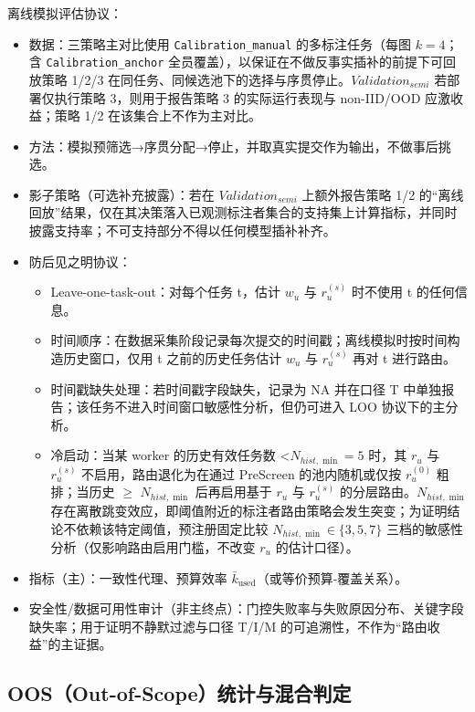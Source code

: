 离线模拟评估协议：
\begin{itemize}
    \item 数据：三策略主对比使用 \texttt{Calibration\_manual} 的多标注任务（每图 $k=4$；含 \texttt{Calibration\_anchor} 全员覆盖），以保证在不做反事实插补的前提下可回放策略 1/2/3 在同任务、同候选池下的选择与序贯停止。$Validation_{semi}$ 若部署仅执行策略 3，则用于报告策略 3 的实际运行表现与 non-IID/OOD 应激收益；策略 1/2 在该集合上不作为主对比。
    \item 方法：模拟预筛选→序贯分配→停止，并取真实提交作为输出，不做事后挑选。
    \item 影子策略（可选补充披露）：若在 $Validation_{semi}$ 上额外报告策略 1/2 的“离线回放”结果，仅在其决策落入已观测标注者集合的支持集上计算指标，并同时披露支持率；不可支持部分不得以任何模型插补补齐。
    \item 防后见之明协议：
    \begin{itemize}
        \item Leave-one-task-out：对每个任务 t，估计 $w_u$ 与 $r_u^{\left(s\right)}$ 时不使用 t 的任何信息。
        \item 时间顺序：在数据采集阶段记录每次提交的时间戳；离线模拟时按时间构造历史窗口，仅用 t 之前的历史任务估计 $w_u$ 与 $r_u^{\left(s\right)}$ 再对 t 进行路由。
        \item 时间戳缺失处理：若时间戳字段缺失，记录为 NA 并在口径 T 中单独报告；该任务不进入时间窗口敏感性分析，但仍可进入 LOO 协议下的主分析。
        \item 冷启动：当某 worker 的历史有效任务数 <$N_{hist,\min}=5$ 时，其 $r_u$ 与 $r_u^{\left(s\right)}$ 不启用，路由退化为在通过 PreScreen 的池内随机或仅按 $r_u^{\left(0\right)}$ 粗排；当历史 $\geq$ $N_{hist,\min}$ 后再启用基于 $r_u$ 与 $r_u^{\left(s\right)}$ 的分层路由。$N_{hist,\min}$ 存在离散跳变效应，即阈值附近的标注者路由策略会发生突变；为证明结论不依赖该特定阈值，预注册固定比较 $N_{hist,\min}\in\{3,5,7\}$ 三档的敏感性分析（仅影响路由启用门槛，不改变 $r_u$ 的估计口径）。
    \end{itemize}
    \item 指标（主）：一致性代理、预算效率 $\bar{k}_{\mathrm{used}}$（或等价预算-覆盖关系）。
    \item 安全性/数据可用性审计（非主终点）：门控失败率与失败原因分布、关键字段缺失率；用于证明不静默过滤与口径 T/I/M 的可追溯性，不作为“路由收益”的主证据。
\end{itemize}
\subsection{OOS（Out-of-Scope）统计与混合判定}\label{sec:method-oos}

